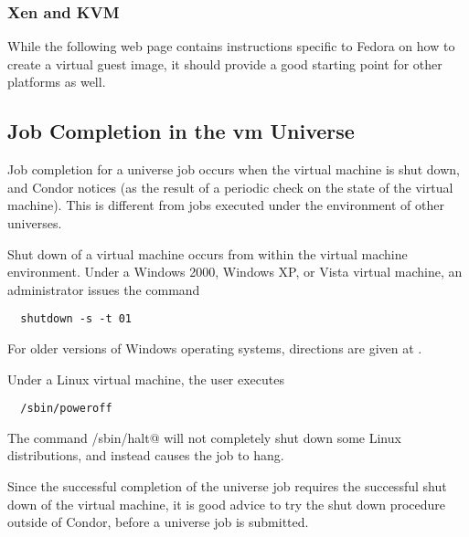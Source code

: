 \subsubsection{\label{sec:vm-disk-image-details-xen}Xen and KVM}
While the following web page contains instructions specific to
Fedora on how to create a virtual guest image,
it should provide a good starting point for 
other platforms as well.


\subsection{\label{sec:vm-job-completion-details}Job Completion in the vm Universe}

Job completion for a  universe job occurs when 
the virtual machine is shut down, and Condor notices 
(as the result of a periodic check on the state of the virtual machine).
This is different from jobs executed under the environment of other 
universes.

Shut down of a virtual machine occurs from within the virtual
machine environment.
Under a Windows 2000, Windows XP, or Vista virtual machine,
an administrator issues the command
\begin{verbatim}
  shutdown -s -t 01
\end{verbatim}
For older versions of Windows operating systems, 
directions are given at
.

Under a Linux virtual machine,
the  user executes
\begin{verbatim}
  /sbin/poweroff
\end{verbatim}
The command \verb@/sbin/halt@ will not completely
shut down some Linux distributions, and instead
causes the job to hang.

Since the successful completion of the  universe job
requires the successful shut down of the virtual machine,
it is good advice to try the shut down procedure outside of
Condor, before a  universe job is submitted.


